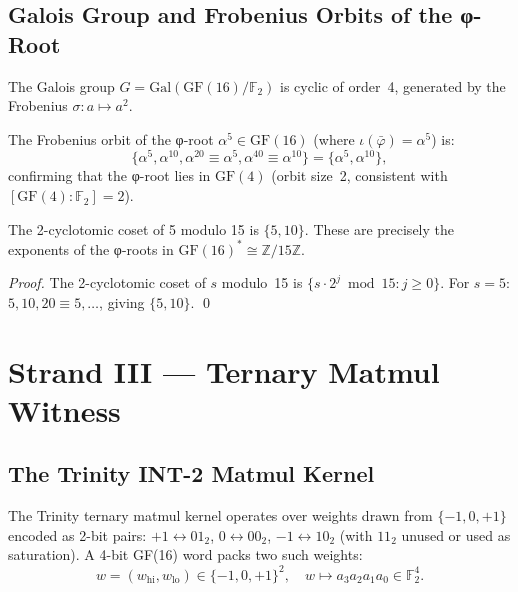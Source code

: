 \subsection{Galois Group and Frobenius Orbits of the φ-Root}
\label{sec:gf16-galois}

The Galois group \(G = \mathrm{Gal}(\mathrm{GF}(16)/\mathbb{F}_2)\) is
cyclic of order~4, generated by the Frobenius \(\sigma\colon a\mapsto a^2\).

The Frobenius orbit of the φ-root \(\alpha^5\in\mathrm{GF}(16)\)
(where \(\iota(\bar\varphi)=\alpha^5\)) is:
\[
  \{\alpha^5, \alpha^{10}, \alpha^{20}\equiv\alpha^{5},\alpha^{40}\equiv\alpha^{10}\}
    = \{\alpha^5, \alpha^{10}\},
\]
confirming that the φ-root lies in \(\mathrm{GF}(4)\) (orbit size~2, consistent with
\([\mathrm{GF}(4):\mathbb{F}_2]=2\)).

\begin{proposition}
\label{prop:cycl-coset}
The 2-cyclotomic coset of 5 modulo 15 is \(\{5,10\}\).
These are precisely the exponents of the φ-roots in
\(\mathrm{GF}(16)^*\cong\mathbb{Z}/15\mathbb{Z}\).
\end{proposition}

\begin{proof}
The 2-cyclotomic coset of \(s\) modulo~15 is
\(\{s\cdot 2^j \bmod 15 : j\geq 0\}\).
For \(s=5\): \(5, 10, 20\equiv 5,\ldots\), giving \(\{5,10\}\).
\qed
\end{proof}

\section{Strand III — Ternary Matmul Witness}
\label{sec:gf16-strand3}

\subsection{The Trinity INT-2 Matmul Kernel}
\label{sec:gf16-matmul}

The Trinity ternary matmul kernel operates over weights drawn from
\(\{-1,0,+1\}\) encoded as 2-bit pairs:
\(+1\leftrightarrow 01_2\), \(0\leftrightarrow 00_2\), \(-1\leftrightarrow 10_2\)
(with \(11_2\) unused or used as saturation).
A 4-bit GF(16) word packs two such weights:
\[
  w = (w_{\mathrm{hi}}, w_{\mathrm{lo}}) \in \{-1,0,+1\}^2,\quad
  w \mapsto a_3a_2a_1a_0 \in \mathbb{F}_2^4.
\]

